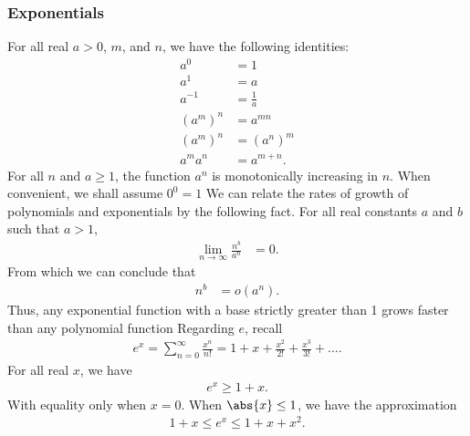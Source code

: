 \documentclass{report}
\begin{document}
        \subsubsection{Exponentials}
        \bigbreak \noindent 
        For all real $a>0$, $m$, and $n$, we have the following identities:
        \begin{align*}
            a^{0} &= 1 \\
            a^{1} &= a \\
            a^{-1} &= \frac{1}{a} \\
            (a^{m})^{n}  &= a^{mn} \\
            (a^{m})^{n} &= (a^{n})^{m} \\
            a^{m}a^{n} &= a^{m+n}
        .\end{align*}
        \bigbreak \noindent 
        For all $n$ and $a \geq 1$, the function $a^{n}$ is monotonically increasing in $n$. When convenient, we shall assume $0^{0} = 1$
        \bigbreak \noindent 
        We can relate the rates of growth of polynomials and exponentials by the following fact. For all real constants $a$ and $b$ such that $a>1$,
        \begin{align*}
            \lim\limits_{n \to \infty}{\frac{n^{b}}{a^{n}}} &=0
        .\end{align*}
        \bigbreak \noindent 
        From which we can conclude that 
        \begin{align*}
            n^{b} &= o(a^{n})
        .\end{align*}
        \bigbreak \noindent 
        Thus, any exponential function with a base strictly greater than 1 grows faster than any polynomial function
        \bigbreak \noindent 
        Regarding $e$, recall
        \begin{align*}
            e^{x} = \sum_{n=0}^{\infty}\frac{x^{n}}{n!} = 1 + x + \frac{x^{2}}{2!} + \frac{x^{3}}{3!} + ...
        .\end{align*}
        \bigbreak \noindent 
        For all real $x$, we have
        \begin{align*}
            e^{x} \geq 1+x
        .\end{align*}
        With equality only when $x=0$. When $\abs{x} \leq 1 $, we have the approximation
        \begin{align*}
            1 + x \leq e^{x} \leq1 + x + x^{2}
        .\end{align*}























        

    
\end{document}
